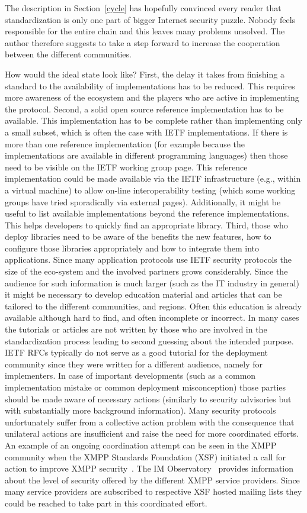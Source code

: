 \documentclass[peerreview, a4paper, 7pt]{IEEEtran}
\begin{document}
The description in Section~\ref{cycle} has hopefully convinced every reader that standardization is only one part of bigger Internet security puzzle. Nobody feels responsible for the entire chain and this leaves many problems unsolved. The author therefore suggests to take a step forward to increase the cooperation between the different communities. 

How would the ideal state look like? First, the delay it takes from finishing a standard to the availability of implementations has to be reduced. This requires more awareness of the ecosystem and the players who are active in implementing the protocol. Second, a solid open source reference implementation has to be available. This implementation has to be complete rather than implementing only a small subset, which is often the case with IETF implementations. If there is more than one reference implementation (for example because the implementations are available in different programming languages) then those need to be visible on the IETF working group page.
This reference implementation could be made available via the IETF infrastructure (e.g., within a virtual machine) to allow on-line interoperability testing (which some working groups have tried sporadically via external pages). Additionally, it might be useful to list available implementations beyond the reference implementations. This helps developers to quickly find an appropriate library. Third, those who deploy libraries need to be aware of the benefits the new features, how to configure those libraries appropriately and how to integrate them into applications. Since many application protocols use IETF security protocols the size of the eco-system and the involved partners grows considerably. Since the audience for such information is much larger (such as the IT industry in general) it might be necessary to develop education material and articles that can be tailored to the different communities, and regions. Often this education is already available although hard to find, and often incomplete or incorrect. In many cases the tutorials or articles are not written by those who are involved in the standardization process leading to second guessing about the intended purpose. IETF RFCs typically do not serve as a good tutorial for the deployment community since they were written for a different audience, namely for implementers. In case of important developments (such as a common implementation mistake or common deployment misconception) those parties should be made aware of necessary actions (similarly to security advisories but with substantially more background information). Many security protocols unfortunately suffer from a collective action problem with the consequence that unilateral actions are insufficient and raise the need for more coordinated efforts. An example of an ongoing coordination attempt can be seen in the XMPP community when the XMPP Standards Foundation (XSF) initiated a call for action to improve XMPP security~\cite{manifesto}. The IM Observatory~\cite{IM-Observatory} provides information about the level of security offered by the different XMPP service providers. Since many service providers are subscribed to respective XSF hosted mailing lists they could be reached to take part in this coordinated effort. 
\end{document}
